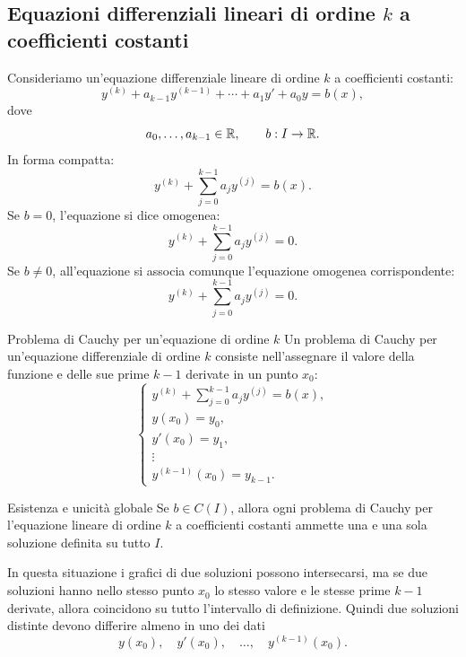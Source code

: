 \documentclass[a4paper]{article}
\begin{document}
\subsection{Equazioni differenziali lineari di ordine \(k\) a coefficienti costanti}

\begin{radioactive}
Consideriamo un'equazione differenziale lineare di ordine \(k\) a coefficienti costanti:
\[
    y^{(k)}
    +
    a_{k-1}y^{(k-1)}
    +\cdots
    +a_1y'
    +a_0y
    =
    b(x),
\]
dove
\[
    a_0,\ldots,a_{k-1}\in\mathbb{R},
    \qquad
    b:I\to\mathbb{R}.
\]
In forma compatta:
\[
    y^{(k)}+\sum_{j=0}^{k-1}a_jy^{(j)}=b(x).
\]
Se \(b=0\), l'equazione si dice omogenea:
\[
    y^{(k)}+\sum_{j=0}^{k-1}a_jy^{(j)}=0.
\]
Se \(b\neq 0\), all'equazione si associa comunque l'equazione omogenea corrispondente:
\[
    y^{(k)}+\sum_{j=0}^{k-1}a_jy^{(j)}=0.
\]
\end{radioactive}

\begin{radioactive}
\begin{snippetdefinition}{Problema di Cauchy per un'equazione di ordine \(k\)}
    Un problema di Cauchy per un'equazione differenziale di ordine \(k\) consiste nell'assegnare il valore della funzione e delle sue prime \(k-1\) derivate in un punto \(x_0\):
    \[
        \begin{cases}
            y^{(k)}+\sum_{j=0}^{k-1}a_jy^{(j)}=b(x),\\
            y(x_0)=y_0,\\
            y'(x_0)=y_1,\\
            \vdots\\
            y^{(k-1)}(x_0)=y_{k-1}.
        \end{cases}
    \]
\end{snippetdefinition}
\end{radioactive}

\begin{radioactive}
\begin{snippettheorem}{Esistenza e unicità globale}
    Se \(b\in C(I)\), allora ogni problema di Cauchy per l'equazione lineare di ordine \(k\) a coefficienti costanti ammette una e una sola soluzione definita su tutto \(I\).
\end{snippettheorem}
\end{radioactive}

\begin{radioactive}
In questa situazione i grafici di due soluzioni possono intersecarsi, ma se due soluzioni hanno nello stesso punto \(x_0\) lo stesso valore e le stesse prime \(k-1\) derivate, allora coincidono su tutto l'intervallo di definizione. Quindi due soluzioni distinte devono differire almeno in uno dei dati
\[
    y(x_0),
    \quad
    y'(x_0),
    \quad
    \ldots,
    \quad
    y^{(k-1)}(x_0).
\]
\end{radioactive}
\end{document}
